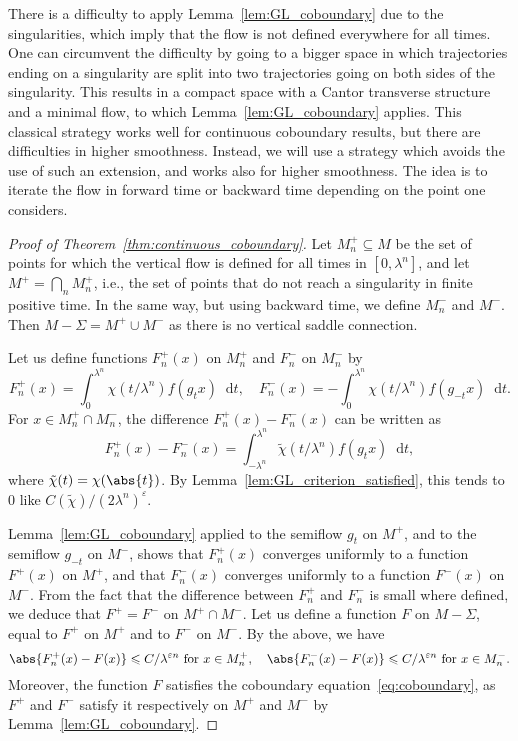 \documentclass[11pt, a4paper, oneside, final, pagebackref]{amsart}
\newcommand{\dd}{\mathop{}\!\mathrm{d}}
\renewcommand{\epsilon}{\varepsilon}
\renewcommand{\leq}{\leqslant}
\theoremstyle{definition}
\numberwithin{equation}{section}
\begin{document}
There is a difficulty to apply Lemma~\ref{lem:GL_coboundary} due to the
singularities, which imply that the flow is not defined everywhere for all
times. One can circumvent the difficulty by going to a bigger space in which
trajectories ending on a singularity are split into two trajectories going on
both sides of the singularity. This results in a compact space with a Cantor
transverse structure and a minimal flow, to which
Lemma~\ref{lem:GL_coboundary} applies. This classical strategy works well for
continuous coboundary results, but there are difficulties in higher
smoothness. Instead, we will use a strategy which avoids the use of such an
extension, and works also for higher smoothness. The idea is to iterate the
flow in forward time or backward time depending on the point one considers.


\begin{proof}[Proof of Theorem~\ref{thm:continuous_coboundary}]
Let $M_n^+ \subseteq M$ be the set of points for which the vertical flow is
defined for all times in $[0,\lambda^n]$, and let $M^+ = \bigcap_n M_n^+$,
i.e., the set of points that do not reach a singularity in finite positive
time. In the same way, but using backward time, we define $M_n^-$ and $M^-$.
Then $M -\Sigma = M^+ \cup M^-$ as there is no vertical saddle connection.

Let us define functions $F_n^+(x)$ on $M_n^+$ and $F_n^-$ on $M_n^-$ by
\begin{equation*}
  F_n^+(x) = \int_0^{\lambda^n} \chi(t/\lambda^n) f(g_t x) \dd t, \quad F_n^-(x) = - \int_0^{\lambda^n} \chi(t/\lambda^n) f(g_{-t} x) \dd t.
\end{equation*}
For $x \in M_n^+ \cap M_n^-$, the difference $F_n^+(x) - F_n^-(x)$ can be
written as
\begin{equation*}
  F_n^+(x) - F_n^-(x) = \int_{-\lambda^n}^{\lambda^n} \tilde \chi(t/\lambda^n) f(g_t x) \dd t,
\end{equation*}
where $\tilde \chi(t) = \chi(\abs{t})$. By
Lemma~\ref{lem:GL_criterion_satisfied}, this tends to $0$ like
$C(\tilde\chi)/(2\lambda^n)^\epsilon$.

Lemma~\ref{lem:GL_coboundary} applied to the semiflow $g_t$ on $M^+$, and to
the semiflow $g_{-t}$ on $M^-$, shows that $F_n^+(x)$ converges uniformly to
a function $F^+(x)$ on $M^+$, and that $F_n^-(x)$ converges uniformly to a
function $F^-(x)$ on $M^-$. From the fact that the difference between $F_n^+$
and $F_n^-$ is small where defined, we deduce that $F^+ = F^-$ on $M^+ \cap
M^-$. Let us define a function $F$ on $M-\Sigma$, equal to $F^+$ on $M^+$ and
to $F^-$ on $M^-$. By the above, we have
\begin{equation}
\label{eq:Fn+F}
  \abs{F_n^+(x) - F(x)} \leq C/\lambda^{\epsilon n} \text{ for $x \in M_n^+$}, \quad
  \abs{F_n^-(x) - F(x)} \leq C/\lambda^{\epsilon n} \text{ for $x \in M_n^-$}.
\end{equation}
Moreover, the function $F$ satisfies the coboundary
equation~\eqref{eq:coboundary}, as $F^+$ and $F^-$ satisfy it respectively on
$M^+$ and $M^-$ by Lemma~\ref{lem:GL_coboundary}.


\end{proof}
\end{document}
